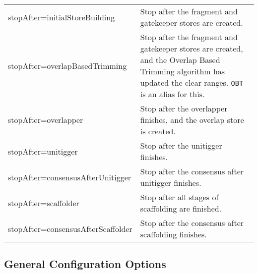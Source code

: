 \documentclass[twoside,11pt]{article}
\begin{document}
\begin{longtable}{lp{3.0in}}

stopAfter=initialStoreBuilding &
Stop after the fragment and gatekeeper stores are created.
\\

stopAfter=overlapBasedTrimming &
Stop after the fragment and gatekeeper stores are created, and the
Overlap Based Trimming algorithm has updated the clear ranges.
{\tt OBT} is an alias for this.
\\

stopAfter=overlapper &
Stop after the overlapper finishes, and the overlap store is created.
\\

stopAfter=unitigger &
Stop after the unitigger finishes.
\\

stopAfter=consensusAfterUnitigger &
Stop after the consensus after unitigger finishes.
\\

stopAfter=scaffolder &
Stop after all stages of scaffolding are finished.
\\

stopAfter=consensusAfterScaffolder &
Stop after the consensus after scaffolding finishes.
\\

\end{longtable}


\subsection{General Configuration Options}
\end{document}
